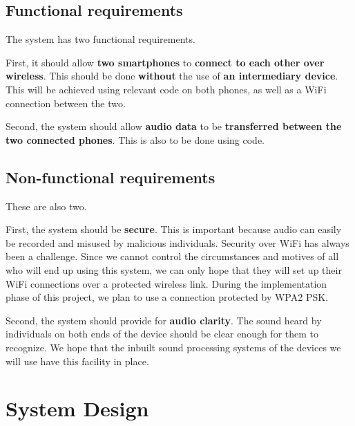 \documentclass[12pt,svgnames,smaller]{article} %
\begin{document}
	\subsection{Functional requirements}
	
	The system has two functional requirements.
	
	First, it should allow \textbf{two smartphones} to \textbf{connect to each other over wireless}. This should be done \textbf{without} the use of \textbf{an intermediary device}. This will be achieved using relevant code on both phones, as well as a WiFi connection between the two.
	
	Second, the system should allow \textbf{audio data} to be \textbf{transferred between the two connected phones}. This is also to be done using code.
	
	
	\subsection{Non-functional requirements}
	
	These are also two.
	
	First, the system should be \textbf{secure}. This is important because audio can easily be recorded and misused by malicious individuals. Security over WiFi has always been a challenge. Since we cannot control the circumstances and motives of all who will end up using this system, we can only hope that they will set up their WiFi connections over a protected wireless link. During the implementation phase of this project, we plan to use a connection protected by WPA2 PSK.
	
	Second, the system should provide for \textbf{audio clarity}. The sound heard by individuals on both ends of the device should be clear enough for them to recognize. We hope that the inbuilt sound processing systems of the devices we will use have this facility in place.
	
	
	
	
	\section{\textbf{System Design}}
	
\end{document}
